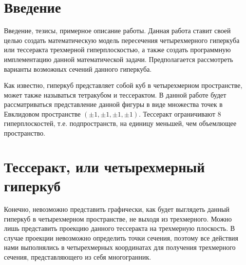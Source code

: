 \documentclass[12pt, a4paper, twoside]{report}
\begin{document}

\tableofcontents

\newpage
\section{Введение}
Введение, тезисы, примерное описание работы.
Данная работа ставит своей целью создать математическую модель пересечения четырехмерного гиперкуба или тессеракта трехмерной гиперплоскостью, а также создать программную имплементацию данной математической задачи. Предполагается рассмотреть варианты возможных сечений данного гиперкуба.

Как известно, гиперкуб представляет собой куб в четырехмерном пространстве, может также называться тетракубом и тессерактом. В данной работе будет рассматриваться представление данной фигуры в виде множества точек в Евклидовом пространстве $(\pm 1,\pm 1,\pm 1, \pm 1)$. Тессеракт ограничивают 8 гиперплоскостей, т.е. подпространств, на единицу меньшей, чем объемлющее пространство.

\begin{figure}[h!]
	\center
	\clearpage
\end{figure}
\section{Тессеракт, или четырехмерный гиперкуб}
Конечно, невозможно представить графически, как будет выглядеть данный гиперкуб в четырехмерном пространстве, не выходя из трехмерного. Можно лишь представить проекцию данного тессеракта на трехмерную плоскость. В случае проекции невозможно определить точки сечения, поэтому все действия нами выполнялись в четырехмерных координатах для получения трехмерного сечения, представляющего из себя многогранник.
\end{document}
